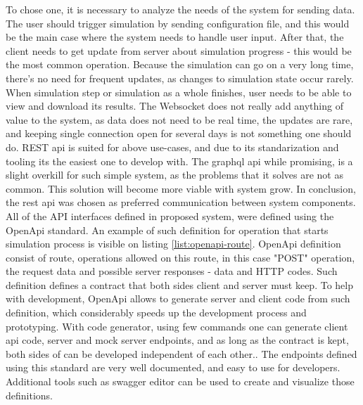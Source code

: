 To chose one, it is necessary to analyze the needs of the system for sending data. The user should trigger simulation by sending configuration file, and this would be the main case where the system needs to handle user input. After that, the client needs to get update from server about simulation progress - this would be the most common operation. Because the simulation can go on a very long time, there's no need for frequent updates, as changes to simulation state occur rarely. When simulation step or simulation as a whole finishes, user needs to be able to view and download its results. The Websocket does not really add anything of value to the system, as data does not need to be real time, the updates are rare, and keeping single connection open for several days is not something one should do.  REST api is suited for above use-cases, and due to its standarization and tooling its the easiest one to develop with. The graphql api while promising, is a slight overkill for such simple system, as the problems that it solves are not as common.  This solution will become more viable with system grow. In conclusion, the rest api was chosen as preferred communication between system components. 
\newpage 
All of the API interfaces defined in proposed system, were defined using the OpenApi standard. An example of such definition for operation that starts simulation process is visible on listing \ref{list:openapi-route}. OpenApi definition consist of route, operations allowed on this route, in this case "POST" operation, the request data and possible server responses - data and HTTP codes. Such definition defines a contract that both sides client and server must keep. To help with development, OpenApi allows to generate server and client code from such definition, which considerably speeds up the development process and prototyping. With code generator, using few commands one can generate client api code, server and mock server endpoints, and as long as the contract is kept, both sides of can be developed independent of each other.. The endpoints defined using this standard are very well documented, and easy to use for developers. Additional tools such as swagger editor can be used to create and visualize those definitions. 

